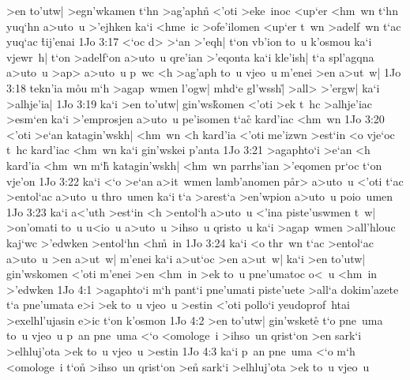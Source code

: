 >en
to'utw|
>egn'wkamen
t`hn
>ag'aph\r{n}
<'oti
>eke~inoc
<up`er
<hm~wn
t`hn
yuq`hn
a>uto~u
>'ejhken
ka`i
<hme~ic
>ofe'ilomen
<up`er
t~wn
>adelf~wn
t`ac
yuq`ac
\r{t}ij'enai\bibvsend
{}
\vs 1Jo 3:17
<`oc
d>
>`an
>'eqh|
t`on
vb'ion
to~u
k'osmou
ka`i
vjewr~h|
t`on
>adelf`on
a>uto~u
qre'ian
>'eqonta
ka`i
kle'ish|
t`a
spl'agqna
a>uto~u
>ap>
a>uto~u
p~wc
<h
>ag'aph
to~u
vjeo~u
m'enei
>en
a>ut~w|\bibvsend
\vs 1Jo 3:18
tekn'ia
m\r{o}u
m`h
>agap~wmen
l'ogw|
mhd`e
gl'wssh|\r{}
>all>
>'ergw|
ka`i
>alhje'ia|\bibvsend
\vs 1Jo 3:19
ka`i
>en
to'utw|
gin'ws\r{k}omen
<'oti
>ek
t~hc
>alhje'iac
>esm`en
ka`i
>'emprosjen
a>uto~u
pe'isomen
t`ac\r{}
kard'iac
<hm~wn\bibvsend
\vs 1Jo 3:20
<'oti
>e`an
katagin'wskh|
<hm~wn
<h
kard'ia
<'oti
me'izwn
>est`in
<o
vje`oc
t~hc
kard'iac
<hm~wn
ka`i
gin'wskei
p'anta\bibvsend
\vs 1Jo 3:21
>agaphto`i
>e`an
<h
kard'ia
<hm~wn
m`h\r{}
katagin'wskh|
<hm~wn
parrhs'ian
>'eqomen
pr`oc
t`on
vje'on\bibvsend
\vs 1Jo 3:22
ka`i
<`o
>e`an
a>it~wmen
lamb'anomen
p\r{a}r>
a>uto~u
<'oti
t`ac
>entol`ac
a>uto~u
thro~umen
ka`i
t`a
>arest`a
>en'wpion
a>uto~u
poio~umen\bibvsend
\vs 1Jo 3:23
ka`i
a<'uth
>est`in
<h
>entol`h
a>uto~u
<'ina
piste'uswmen
t~w|
>on'omati
to~u
u<io~u
a>uto~u
>ihso~u
qristo~u
ka`i
>agap~wmen
>all'hlouc
kaj`wc
>'edwken
>entol`hn
<h\r{m}~in\bibvsend
{}
\vs 1Jo 3:24
ka`i
<o
thr~wn
t`ac
>entol`ac
a>uto~u
>en
a>ut~w|
m'enei
ka`i
a>ut`oc
>en
a>ut~w|
ka`i
>en
to'utw|
gin'wskomen
<'oti
m'enei
>en
<hm~in
>ek
to~u
pne'umatoc
o<~u
<hm~in
>'edwken\bibvsend
\vs 1Jo 4:1
>agaphto`i
m`h
pant`i
pne'umati
piste'uete
>all`a
dokim'azete
t`a
pne'umata
e>i
>ek
to~u
vjeo~u
>estin
<'oti
pollo`i
yeudoprof~htai
>exelhl'ujasin
e>ic
t`on
k'osmon\bibvsend
\vs 1Jo 4:2
>en
to'utw|
gin'wsket\r{e}
t`o
pne~uma
to~u
vjeo~u
p~an
pne~uma
<`o
<omologe~i
>ihso~un
qrist`on
>en
sark`i
>elhluj'ota
>ek
to~u
vjeo~u
>estin\bibvsend
\vs 1Jo 4:3
ka`i
p~an
pne~uma
<`o
m`h
<omologe~i
t`on\r{}
>ihso~un
qrist`on
>en\r{}
sark`i
>elhluj'ota
>ek
to~u
vjeo~u
